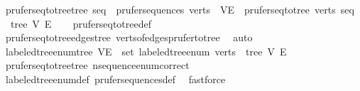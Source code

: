 \begin{isabellebody}
\isanewline
%
\endisadelimproof
\isanewline
{}\isamarkupfalse%
\ prufer{\isacharunderscore}{\kern0pt}seq{\isacharunderscore}{\kern0pt}to{\isacharunderscore}{\kern0pt}tree{\isacharunderscore}{\kern0pt}tree{\isacharcolon}{\kern0pt}\ {\isachardoublequoteopen}seq\ {\isasymin}\ prufer{\isacharunderscore}{\kern0pt}sequences\ verts\ {\isasymLongrightarrow}\ {\isacharparenleft}{\kern0pt}V{\isacharcomma}{\kern0pt}E{\isacharparenright}{\kern0pt}\ {\isacharequal}{\kern0pt}\ prufer{\isacharunderscore}{\kern0pt}seq{\isacharunderscore}{\kern0pt}to{\isacharunderscore}{\kern0pt}tree\ verts\ seq\ {\isasymLongrightarrow}\ tree\ V\ E{\isachardoublequoteclose}\isanewline
%
\isadelimproof
\ \ %
\endisadelimproof
%
\isatagproof
{}\isamarkupfalse%
\ prufer{\isacharunderscore}{\kern0pt}seq{\isacharunderscore}{\kern0pt}to{\isacharunderscore}{\kern0pt}tree{\isacharunderscore}{\kern0pt}def\ \isamarkupfalse%
\ prufer{\isacharunderscore}{\kern0pt}seq{\isacharunderscore}{\kern0pt}to{\isacharunderscore}{\kern0pt}tree{\isacharunderscore}{\kern0pt}edges{\isacharunderscore}{\kern0pt}tree\ verts{\isacharunderscore}{\kern0pt}of{\isacharunderscore}{\kern0pt}edges{\isacharunderscore}{\kern0pt}prufer{\isacharunderscore}{\kern0pt}to{\isacharunderscore}{\kern0pt}tree\ \isamarkupfalse%
\ auto%
\endisatagproof
{\isafoldproof}%
%
\isadelimproof
\isanewline
%
\endisadelimproof
\isanewline
{}\isamarkupfalse%
\ labeled{\isacharunderscore}{\kern0pt}tree{\isacharunderscore}{\kern0pt}enum{\isacharunderscore}{\kern0pt}tree{\isacharcolon}{\kern0pt}\ {\isachardoublequoteopen}{\isacharparenleft}{\kern0pt}V{\isacharcomma}{\kern0pt}E{\isacharparenright}{\kern0pt}\ {\isasymin}\ set\ {\isacharparenleft}{\kern0pt}labeled{\isacharunderscore}{\kern0pt}tree{\isacharunderscore}{\kern0pt}enum\ verts{\isacharparenright}{\kern0pt}\ {\isasymLongrightarrow}\ tree\ V\ E{\isachardoublequoteclose}\isanewline
%
\isadelimproof
\ \ %
\endisadelimproof
%
\isatagproof
{}\isamarkupfalse%
\ prufer{\isacharunderscore}{\kern0pt}seq{\isacharunderscore}{\kern0pt}to{\isacharunderscore}{\kern0pt}tree{\isacharunderscore}{\kern0pt}tree\ n{\isacharunderscore}{\kern0pt}sequence{\isacharunderscore}{\kern0pt}enum{\isacharunderscore}{\kern0pt}correct\ \isamarkupfalse%
\ labeled{\isacharunderscore}{\kern0pt}tree{\isacharunderscore}{\kern0pt}enum{\isacharunderscore}{\kern0pt}def\ prufer{\isacharunderscore}{\kern0pt}sequences{\isacharunderscore}{\kern0pt}def\ \isamarkupfalse%
\ fastforce%
\endisatagproof
{\isafoldproof}%

\end{isabellebody}
